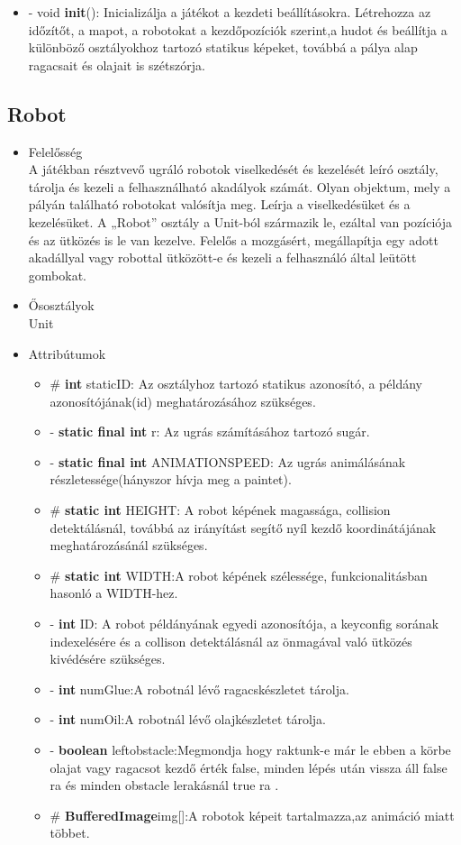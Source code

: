\begin{itemize}
\begin{itemize}
	\item- void \textbf{init}(): Inicializálja a játékot a kezdeti beállításokra. Létrehozza az időzítőt, a mapot, a robotokat a kezdőpozíciók szerint,a hudot és beállítja a különböző osztályokhoz tartozó statikus képeket, továbbá a pálya alap ragacsait és olajait is szétszórja.
	\end{itemize}
\end{itemize}

\subsection{Robot}
\begin{itemize}
\item Felelősség\\
A játékban résztvevő ugráló robotok viselkedését és kezelését leíró osztály, tárolja és kezeli a felhasználható akadályok számát.
  Olyan objektum, mely a pályán található robotokat valósítja meg. Leírja a viselkedésüket és a kezelésüket. 
  A „Robot” osztály a Unit-ból származik le, ezáltal van pozíciója és az ütközés is le van kezelve. 
  Felelős a mozgásért, megállapítja egy adott akadállyal vagy robottal ütközött-e és kezeli a felhasználó által leütött gombokat.
  \item Ősosztályok\\
Unit

\item Attribútumok
	\begin{itemize}
		\item\# \textbf{int} staticID: Az osztályhoz tartozó statikus azonosító, a példány                azonosítójának(id) meghatározásához szükséges.
			\item- \textbf{static final int} r: Az ugrás számításához tartozó sugár. 
				\item- \textbf{static final int} ANIMATIONSPEED: Az ugrás animálásának részletessége(hányszor hívja meg a paintet). 
		\item\# \textbf{static int} HEIGHT: A robot képének magassága, collision                      detektálásnál, továbbá az irányítást segítő nyíl kezdő koordinátájának                  meghatározásánál szükséges.
		\item\# \textbf{static int} WIDTH:A robot képének szélessége, funkcionalitásban hasonló a WIDTH-hez.
		\item- \textbf{int} ID: A robot példányának egyedi azonosítója, a keyconfig sorának                     indexelésére és a collison detektálásnál az önmagával való ütközés                      kivédésére szükséges.
		\item- \textbf{int} numGlue:A robotnál lévő ragacskészletet tárolja.
		\item- \textbf{int} numOil:A robotnál lévő olajkészletet tárolja.
		\item- \textbf{boolean} leftobstacle:Megmondja hogy raktunk-e már le ebben a körbe olajat vagy ragacsot kezdő érték false, minden lépés után vissza áll false ra és minden obstacle lerakásnál true ra .
	\item\# \textbf{BufferedImage}img[]:A robotok képeit tartalmazza,az animáció miatt többet.
	

\end{itemize}
\end{itemize}

